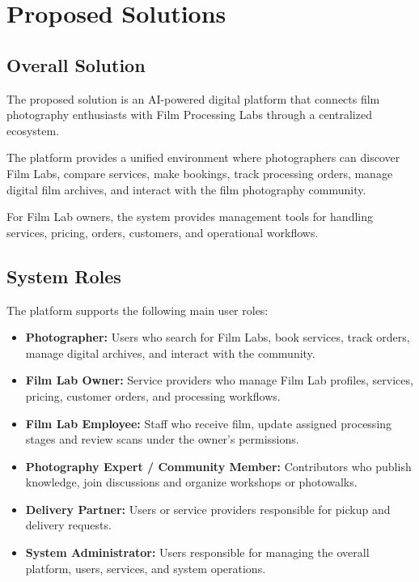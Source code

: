 
\section{Proposed Solutions}

\subsection{Overall Solution}

The proposed solution is an AI-powered digital platform that connects film photography enthusiasts with Film Processing Labs through a centralized ecosystem.

The platform provides a unified environment where photographers can discover Film Labs, compare services, make bookings, track processing orders, manage digital film archives, and interact with the film photography community.

For Film Lab owners, the system provides management tools for handling services, pricing, orders, customers, and operational workflows.

\subsection{System Roles}

The platform supports the following main user roles:

\begin{itemize}
    \item \textbf{Photographer:} Users who search for Film Labs, book services, track orders, manage digital archives, and interact with the community.
    
    \item \textbf{Film Lab Owner:} Service providers who manage Film Lab profiles, services, pricing, customer orders, and processing workflows.
    \item \textbf{Film Lab Employee:} Staff who receive film, update assigned processing stages and review scans under the owner's permissions.
    \item \textbf{Photography Expert / Community Member:} Contributors who publish knowledge, join discussions and organize workshops or photowalks.
    
    \item \textbf{Delivery Partner:} Users or service providers responsible for pickup and delivery requests.
    
    \item \textbf{System Administrator:} Users responsible for managing the overall platform, users, services, and system operations.
\end{itemize}


